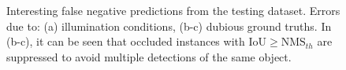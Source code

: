  \begin{figure}[!ht]
  \centering
  \caption{Interesting false negative predictions from the testing dataset. Errors due to: (a) illumination conditions, (b-c) dubious ground truths. In (b-c), it can be seen that occluded instances with $\text{IoU} \geq \text{NMS}_{th}$ are suppressed to avoid multiple detections of the same object.}
  \label{fig4}
\end{figure}

